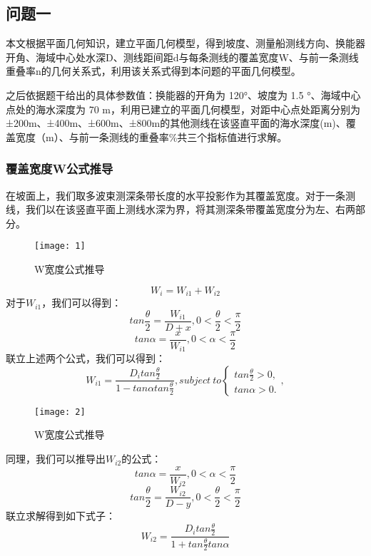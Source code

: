 \documentclass[withoutpreface,bwprint]{cumcmthesis} %
\begin{document}
\subsection{问题一}
本文根据平面几何知识，建立平面几何模型，得到坡度、测量船测线方向、换能器开角、海域中心处水深D、测线距间距d与每条测线的覆盖宽度W、与前一条测线重叠率n的几何关系式，利用该关系式得到本问题的平面几何模型。

之后依据题干给出的具体参数值：换能器的开角为 120°、坡度为 1.5 °、海域中心点处的海水深度为 70 m，利用已建立的平面几何模型，对距中心点处距离分别为±200m、±400m、±600m、±800m的其他测线在该竖直平面的海水深度(m)、覆盖宽度（m）、与前一条测线的重叠率\%共三个指标值进行求解。
\subsubsection{覆盖宽度W公式推导}
在坡面上，我们取多波束测深条带长度的水平投影作为其覆盖宽度。对于一条测线，我们以在该竖直平面上测线水深为界，将其测深条带覆盖宽度分为左、右两部分。
\begin{figure}[H]
    \centering
    \texttt{[image: 1]}
    \caption{W宽度公式推导}
    \label{fig:one}
\end{figure}
\begin{equation}
W_{i}=W_{i1}+W_{i2}
\end{equation}
对于$W_{i1}$，我们可以得到：
\begin{equation}
tan\frac{\theta}{2}=\frac{W_{i1}}{D+x}, 0<\frac{\theta}{2}<\frac{\pi}{2}
\end{equation}
\begin{equation}
tan \alpha=\frac{x}{W_{i1}}, 0<\alpha<\frac{\pi}{2}
\end{equation}
联立上述两个公式，我们可以得到：
\begin{equation}
W_{i1}=\frac{D_itan\frac{\theta}{2}}{1-tan\alpha tan\frac{\theta}{2}}, subject\ to
\left\{
\begin{aligned}
tan\frac{\theta}{2}>0, \\
tan\alpha>0.
\end{aligned}
\right.
,
\end{equation}
\begin{figure}[!h]
    \centering
    \texttt{[image: 2]}
    \caption{W宽度公式推导}
    \label{fig:two}
\end{figure}

同理，我们可以推导出$W_{i2}$的公式：
\begin{equation}
tan \alpha=\frac{x}{W_{i2}}, 0<\alpha<\frac{\pi}{2}
\end{equation}
\begin{equation}
tan\frac{\theta}{2}=\frac{W_{i2}}{D-y}, 0<\frac{\theta}{2}<\frac{\pi}{2}
\end{equation}
联立求解得到如下式子：
\begin{equation}
W_{i2}=\frac{D_itan\frac{\theta}{2}}{1+tan\frac{\theta}{2} tan\alpha}
\end{equation}
\end{document}
